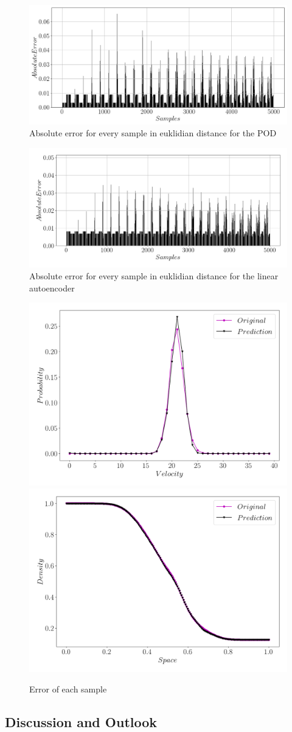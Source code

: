 \documentclass[12pt, a4paper]{article}
\begin{document}
\begin{figure}[htb!]
	\centering
	\includegraphics[width=\textwidth]{Figures/Error_samples_SVD.png}
	\caption{Absolute error for every sample in euklidian distance for the POD}
	\label{Fig:Error_samples_svd}
\end{figure}
\begin{figure}[htb!]
	\centering
	\includegraphics[width=\textwidth]{Figures/Error_samples_v1_1.png}
	\caption{Absolute error for every sample in euklidian distance for the linear autoencoder}
	\label{Fig:error_sample}
\end{figure} 
\begin{figure}[htb!]
	\centering
	\includegraphics[width=.49\textwidth]{Figures/Sample500_v1_1.png}
	\includegraphics[width=.49\textwidth]{Figures/Density_last_v1_1.png}
	\caption{Error of each sample}
	\label{Fig:Errormore}
\end{figure}
\subsection{Discussion and Outlook}
\end{document}
